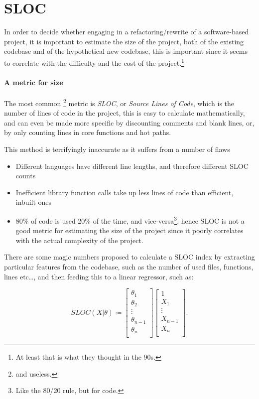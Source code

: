 \documentclass[openright, twoside, twocolumn]{report}
\begin{document}
\section{SLOC}
In order to decide whether engaging in a refactoring/rewrite of a software-based project, it is important to estimate the size of the project,
both of the existing codebase and of the hypothetical new codebase, this is important since it seems to correlate with the difficulty
and the cost of the project.\footnote{
  At least that is what they thought in the 90s.
}

\paragraph{A metric for size}

The most common \footnote{and useless.} metric is \emph{SLOC}, or \emph{Source Lines of Code}, which is the number of lines of code in the project,
this is easy to calculate mathematically, and can even be made more specific by discounting comments and blank lines, or, by only
counting lines in core functions and hot paths.

This method is terrifyingly inaccurate as it suffers from a number of flaws
\begin{itemize}
  \item Different languages have different line lengths, and therefore different SLOC counts
  \item Inefficient library function calls take up less lines of code than efficient, inbuilt ones
  \item 80\% of code is used 20\% of the time, and vice-versa\footnote{
    Like the 80/20 rule, but for code.
  }, hence SLOC is not a good metric for estimating the size of the project since it poorly correlates with the actual complexity of the project.
\end{itemize}

There are some magic numbers proposed to calculate a SLOC index by extracting particular features from the codebase, such as the number of
used files, functions, lines etc\dots, and then feeding this to a linear regressor, such as:

\[
  SLOC(X|\theta) \coloneqq \begin{bmatrix}
     \theta_1 \\
     \theta_2 \\
     \vdots  \\
    \theta_{n-1} \\
     \theta_n \\
  \end{bmatrix} \begin{bmatrix}
     1 \\
     X_1 \\
     \vdots  \\
    X_{n-1} \\
     X_n \\
  \end{bmatrix}
.\]
\end{document}
